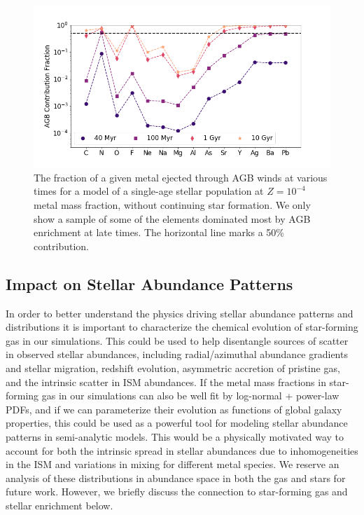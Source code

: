 \begin{figure}
\centering
\includegraphics[width=0.95\linewidth]{figures/ch3/Half_AGB_Fraction_elements_s0}
\caption{The fraction of a given metal ejected through AGB winds at various times for a model of a single-age stellar population at $Z = 10^{-4}$ metal mass fraction, without continuing star formation. We only show a sample of some of the elements dominated most by AGB enrichment at late times. The horizontal line marks a 50\% contribution.}
\label{ch3:fig:agb evolution}
\end{figure}

\subsection{Impact on Stellar Abundance Patterns}
\label{ch3:sec:stellar abundances}
In order to better understand the physics driving stellar abundance patterns and distributions it is important to characterize the chemical evolution of star-forming gas in our simulations. This could be used to help disentangle sources of scatter in observed stellar abundances, including radial/azimuthal abundance gradients and stellar migration, redshift evolution, asymmetric accretion of pristine gas, and the intrinsic scatter in ISM abundances. If the metal mass fractions in star-forming gas in our simulations can also be well fit by log-normal + power-law PDFs, and if we can parameterize their evolution as functions of global galaxy properties, this could be used as a powerful tool for modeling stellar abundance patterns in semi-analytic models. This would be a physically motivated way to account for both the intrinsic spread in stellar abundances due to inhomogeneities in the ISM and variations in mixing for different metal species. We reserve an analysis of these distributions in abundance space in both the gas and stars for future work. However, we briefly discuss the connection to star-forming gas and stellar enrichment below.

